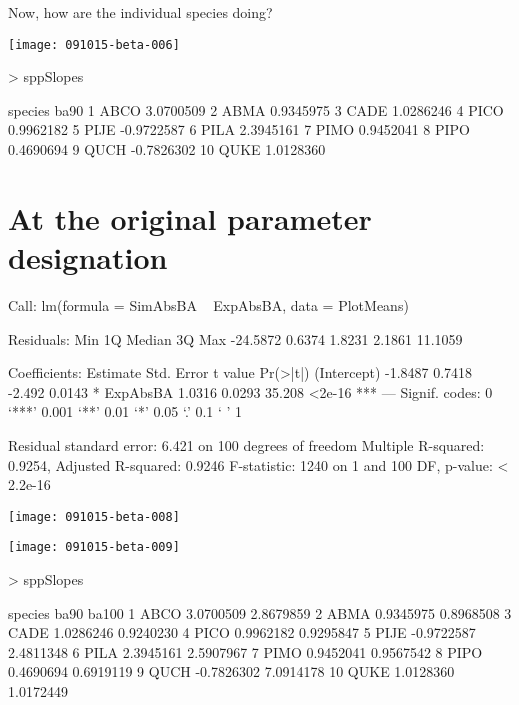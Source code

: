 \documentclass{article}
\begin{document}
Now, how are the individual species doing?

\texttt{[image: 091015-beta-006]}
\begin{Schunk}
\begin{Sinput}
>   sppSlopes
\end{Sinput}
\begin{Soutput}
   species       ba90
1     ABCO  3.0700509
2     ABMA  0.9345975
3     CADE  1.0286246
4     PICO  0.9962182
5     PIJE -0.9722587
6     PILA  2.3945161
7     PIMO  0.9452041
8     PIPO  0.4690694
9     QUCH -0.7826302
10    QUKE  1.0128360
\end{Soutput}
\end{Schunk}


\newpage
\section{At the original parameter designation}
\begin{Schunk}
\begin{Soutput}
Call:
lm(formula = SimAbsBA ~ ExpAbsBA, data = PlotMeans)

Residuals:
     Min       1Q   Median       3Q      Max 
-24.5872   0.6374   1.8231   2.1861  11.1059 

Coefficients:
            Estimate Std. Error t value Pr(>|t|)    
(Intercept)  -1.8487     0.7418  -2.492   0.0143 *  
ExpAbsBA      1.0316     0.0293  35.208   <2e-16 ***
---
Signif. codes:  0 ‘***’ 0.001 ‘**’ 0.01 ‘*’ 0.05 ‘.’ 0.1 ‘ ’ 1

Residual standard error: 6.421 on 100 degrees of freedom
Multiple R-squared:  0.9254,	Adjusted R-squared:  0.9246 
F-statistic:  1240 on 1 and 100 DF,  p-value: < 2.2e-16
\end{Soutput}
\end{Schunk}
\texttt{[image: 091015-beta-008]}

\texttt{[image: 091015-beta-009]}
\begin{Schunk}
\begin{Sinput}
>   sppSlopes
\end{Sinput}
\begin{Soutput}
   species       ba90     ba100
1     ABCO  3.0700509 2.8679859
2     ABMA  0.9345975 0.8968508
3     CADE  1.0286246 0.9240230
4     PICO  0.9962182 0.9295847
5     PIJE -0.9722587 2.4811348
6     PILA  2.3945161 2.5907967
7     PIMO  0.9452041 0.9567542
8     PIPO  0.4690694 0.6919119
9     QUCH -0.7826302 7.0914178
10    QUKE  1.0128360 1.0172449
\end{Soutput}
\end{Schunk}
\end{document}
